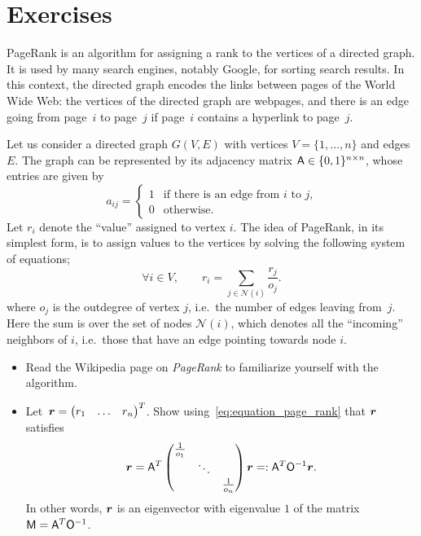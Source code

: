\section{Exercises}
\begin{exercise}
    PageRank is an algorithm for assigning a rank to the vertices of a directed graph.
    It is used by many search engines, notably Google,
    for sorting search results.
    In this context,
    the directed graph encodes the links between pages of the World Wide Web:
    the vertices of the directed graph are webpages,
    and there is an edge going from page~$i$ to page~$j$ if page~$i$ contains a hyperlink to page~$j$.

    Let us consider a directed graph $G(V, E)$ with vertices $V = \{1, \dotsc, n\}$ and edges $E$.
    The graph can be represented by its adjacency matrix $\mathsf A \in \{0, 1\}^{n \times n}$,
    whose entries are given by
    \[
        a_{ij} =
        \begin{cases}
            1 & \text{if there is an edge from $i$ to $j$,} \\
            0 & \text{otherwise.}
        \end{cases}
    \]
    Let $r_i$ denote the ``value'' assigned to vertex $i$.
    The idea of PageRank, in its simplest form,
    is to assign values to the vertices
    by solving the following system of equations;
    \begin{equation}
        \label{eq:equation_page_rank}
        \forall i \in V, \qquad
        r_i
        = \sum_{j \in \mathcal N(i)} \frac{r_j}{o_j}.
    \end{equation}
    where $o_j$ is the outdegree of vertex $j$,
    i.e.\ the number of edges leaving from~$j$.
    Here the sum is over the set of nodes $\mathcal N(i)$, which denotes all the ``incoming'' neighbors of $i$,
    i.e.\ those that have an edge pointing towards node $i$.
    \begin{itemize}
        \item
            Read the Wikipedia page on \emph{PageRank} to familiarize yourself with the algorithm.

        \item
            Let~$\mathbf{\boldsymbol{r}} = \begin{pmatrix} r_1 & \hdots & r_n \end{pmatrix}^T$.
            Show using~\eqref{eq:equation_page_rank} that $\mathbf{\boldsymbol{r}}$ satisfies
            \[
                \mathbf{\boldsymbol{r}} =
                \mathsf A^T
                \begin{pmatrix}
                    \frac{1}{o_1} & &  \\
                                  & \ddots & \\
                                  & & \frac{1}{o_n}
                \end{pmatrix}
                \mathbf{\boldsymbol{r}} =:  \mathsf A^T \mathsf O^{-1} \mathbf{\boldsymbol{r}}.
            \]
            In other words, $\mathbf{\boldsymbol{r}}$ is an eigenvector with eigenvalue $1$ of the matrix $\mathsf M = \mathsf A^T \mathsf O^{-1}$.


\end{itemize}
\end{exercise}
